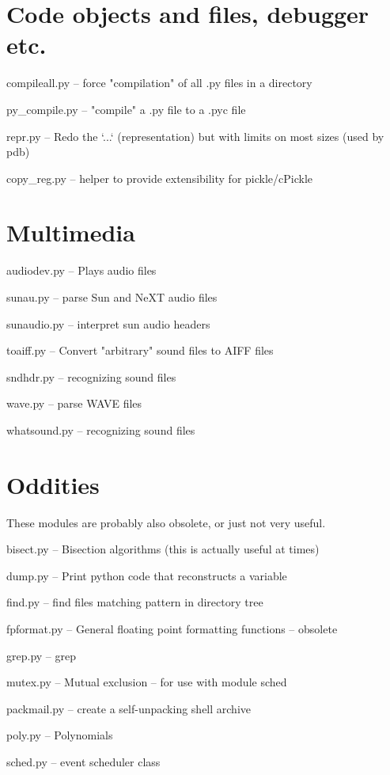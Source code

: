 \section{Code objects and files, debugger etc.}

compileall.py -- force "compilation" of all .py files in a directory

py_compile.py -- "compile" a .py file to a .pyc file

repr.py -- Redo the `...` (representation) but with limits on most
sizes (used by pdb)

copy_reg.py -- helper to provide extensibility for pickle/cPickle


\section{Multimedia}

audiodev.py -- Plays audio files

sunau.py -- parse Sun and NeXT audio files

sunaudio.py -- interpret sun audio headers

toaiff.py -- Convert "arbitrary" sound files to AIFF files

sndhdr.py -- recognizing sound files

wave.py -- parse WAVE files

whatsound.py -- recognizing sound files


\section{Oddities}

These modules are probably also obsolete, or just not very useful.

bisect.py -- Bisection algorithms (this is actually useful at times)

dump.py -- Print python code that reconstructs a variable

find.py -- find files matching pattern in directory tree

fpformat.py -- General floating point formatting functions -- obsolete

grep.py -- grep

mutex.py -- Mutual exclusion -- for use with module sched

packmail.py -- create a self-unpacking \UNIX{} shell archive

poly.py -- Polynomials

sched.py -- event scheduler class

